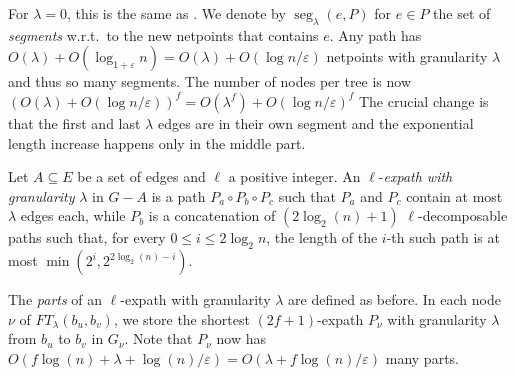 \documentclass{article}\usepackage[a4paper,margin=20mm]{geometry}
\DeclareMathOperator{\seg}{seg}
\renewcommand{\le}{\leqslant}
\newcommand{\eps}{\varepsilon}
\begin{document}
For $\lambda = 0$, this is the same as .
We denote by $\seg_\lambda(e,P)$ for $e\in P$
the set of \emph{segments} w.r.t.\ to the new netpoints that contains $e$.
Any path has $O(\lambda) + O(\log_{1+\eps}n)= O(\lambda)+ O(\log n/\eps)$ 
netpoints with granularity $\lambda$ and thus so many segments.
The number of nodes per tree is now $(O(\lambda)+O(\log n/\eps))^f = O(\lambda^f) + O(\log n/\eps)^f $
The crucial change is that the first and last $\lambda$ edges are in their own segment
and the exponential length increase happens only in the middle part.

\begin{definition}
\label{definition:l-expath_granularity}
  Let $A \subseteq E$ be a set of edges and $\ell$ a positive integer.
  An $\ell$-\emph{expath with granularity} $\lambda$ in $G{-}A$ is a path
  $P_a \circ P_b \circ P_c$
  such that $P_a$ and $P_c$ contain at most $\lambda$ edges each, 
  while $P_b$ is a concatenation of $(2\log_2(n){+}1)$
  $\ell$-decomposable paths
  such that, for every $0 \le i \le 2\log_2 n$,
  the length of the $i$-th such path is at most $\min(2^i, 2^{2\log_2(n) - i})$.
\end{definition}

The \emph{parts} of an $\ell$-expath with granularity $\lambda$ are defined as before.
In each node $\nu$ of $FT_\lambda(b_u,b_v)$,
we store the shortest $(2f{+}1)$-expath $P_\nu$ with granularity $\lambda$ 
from $b_u$ to $b_v$ in $G_\nu$.
Note that $P_\nu$ now has
$O(f\log(n) + \lambda+ \log(n)/\varepsilon) = O(\lambda+ f\log(n)/\varepsilon)$ many parts.
\vspace*{.5em}
\end{document}
